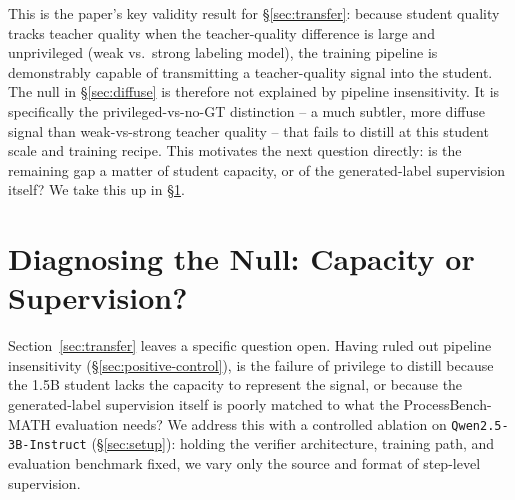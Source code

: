 \documentclass[11pt]{article}
\begin{document}
This is the paper's key validity result for \S\ref{sec:transfer}: because
student quality tracks teacher quality when the teacher-quality difference
is large and unprivileged (weak vs.\ strong labeling model), the training
pipeline is demonstrably capable of transmitting a teacher-quality signal
into the student. The null in \S\ref{sec:diffuse} is therefore not explained
by pipeline insensitivity. It is specifically the privileged-vs-no-GT
distinction -- a much subtler, more diffuse signal than weak-vs-strong
teacher quality -- that fails to distill at this student scale and training
recipe. This motivates the next question directly: is the remaining gap a
matter of student capacity, or of the generated-label supervision itself?
We take this up in \S\ref{sec:mismatch}.

\section{Diagnosing the Null: Capacity or Supervision?}
\label{sec:mismatch}

Section~\ref{sec:transfer} leaves a specific question open. Having ruled out
pipeline insensitivity (\S\ref{sec:positive-control}), is the failure of
privilege to distill because the 1.5B student lacks the capacity to
represent the signal, or because the generated-label supervision itself is
poorly matched to what the ProcessBench-MATH evaluation needs? We address
this with a controlled ablation on \texttt{Qwen2.5-3B-Instruct}
(\S\ref{sec:setup}): holding the verifier architecture, training path, and
evaluation benchmark fixed, we vary only the source and format of step-level
supervision.
\end{document}
